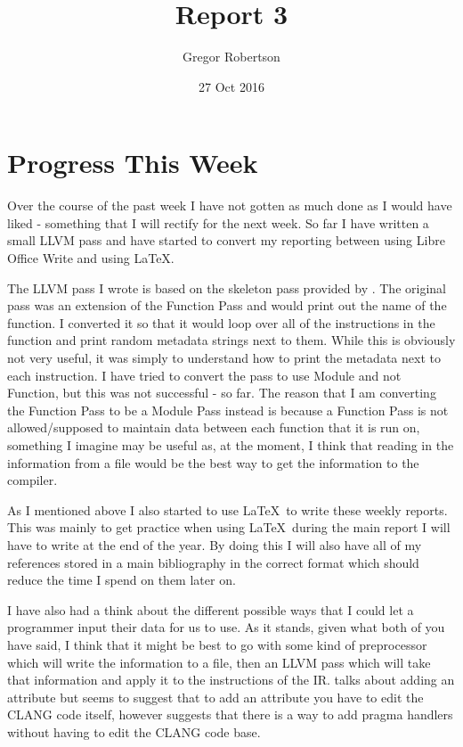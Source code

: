 \documentclass{article}
\title{Report 3}
\author{Gregor Robertson}
\date{27 Oct 2016}
\begin{document}
 
\maketitle
 
\section*{Progress This Week}
Over the course of the past week I have not gotten as much done as I would have liked - something that I will rectify for the next week. So far I have written a small LLVM pass and have started to convert my reporting between using Libre Office Write and using \LaTeX. 

The LLVM pass I wrote is based on the skeleton pass provided by \cite{skeleton}. The original pass was an extension of the Function Pass and would print out the name of the function. I converted it so that it would loop over all of the instructions in the function and print random metadata strings next to them. While this is obviously not very useful, it was simply to understand how to print the metadata next to each instruction. I have tried to convert the pass to use Module and not Function, but this was not successful - so far. The reason that I am converting the Function Pass to be a Module Pass instead is because a Function Pass is not allowed/supposed to maintain data between each function that it is run on, something I imagine may be useful as, at the moment, I think that reading in the information from a file would be the best way to get the information to the compiler. 

As I mentioned above I also started to use \LaTeX\ to write these weekly reports. This was mainly to get practice when using \LaTeX\ during the main report I will have to write at the end of the year. By doing this I will also have all of my references stored in a main bibliography in the correct format which should reduce the time I spend on them later on.

I have also had a think about the different possible ways that I could let a programmer input their data for us to use. As it stands, given what both of you have said, I think that it might be best to go with some kind of preprocessor which will write the information to a file, then an LLVM pass which will take that information and apply it to the instructions of the IR. \cite{howToAddAnAttribute} talks about adding an attribute but seems to suggest that to add an attribute you have to edit the CLANG code itself, however \cite{clangDoc} suggests that there is a way to add pragma handlers without having to edit the CLANG code base.
\end{document}
